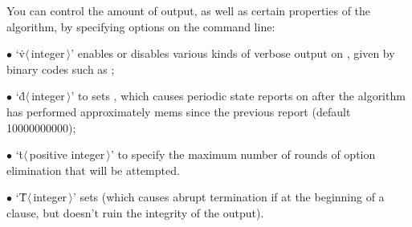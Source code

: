 You can control the amount of output,
as well as certain properties of the algorithm,
by specifying options on the command line:
\smallskip\item{$\bullet$}
`\.v$\langle\,$integer$\,\rangle$' enables or disables various kinds of verbose
output on , given by binary codes such as ;
\item{$\bullet$}
`\.d$\langle\,$integer$\,\rangle$' to sets , which causes
periodic
state reports on  after the algorithm has performed
approximately
 mems since the previous report (default 10000000000);
\item{$\bullet$}
`\.t$\langle\,$positive integer$\,\rangle$' to specify the maximum number of
rounds of option elimination that will be attempted.
\item{$\bullet$}
`\.T$\langle\,$integer$\,\rangle$' sets  (which causes abrupt
termination if  at the beginning of a clause, but
doesn't
ruin the integrity of the output).

